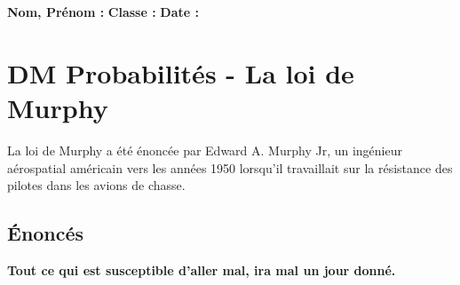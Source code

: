 \documentclass[11pt]{article}
\begin{document}

\newtheorem{Definition}{Définition}
\newtheorem{Theorem}{Théorème}
\newtheorem{Proposition}{Propriété}

\renewcommand{\labelitemi}{$\bullet$}
\renewcommand{\labelitemii}{$\circ$}

\newcommand{\Pointilles}[1][3]{%
\multido{}{#1}{\makebox[\linewidth]{\dotfill}\\[\parskip]
}}


\setlength{\columnseprule}{1pt}

\textbf{Nom, Prénom :} \hspace{8cm} \textbf{Classe :} \hspace{3cm} \textbf{Date :}\\
\vspace{-0.8cm}

\section*{DM Probabilités - La loi de Murphy}

La loi de Murphy a été énoncée par Edward A. Murphy Jr, un ingénieur aérospatial américain vers les années 1950 lorsqu'il travaillait sur la résistance des pilotes dans les avions de chasse.

\subsection*{Énoncés}

\begin{center}
    \textbf{\og Tout ce qui est susceptible d'aller mal, ira mal un jour donné.\fg}
\end{center}
\end{document}
